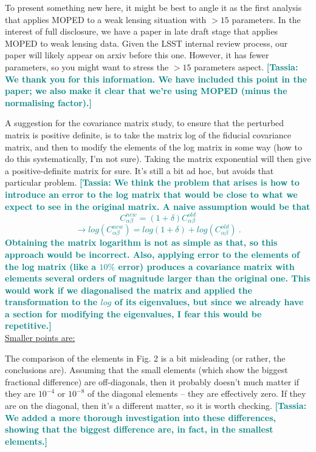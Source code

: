 \documentclass{article}
\newcommand\tassia[1]{{\bf {\textcolor{teal}{[Tassia: #1]}}}}
\begin{document}
	To present something new here, it might be best to angle it as the first analysis that applies MOPED to a weak lensing situation with $>15$ parameters.   In the interest of full disclosure, we have a paper in late draft stage that applies MOPED to weak lensing data.  Given the LSST internal review process, our paper will likely appear on arxiv before this one.  However, it has fewer parameters, so you might want to stress the $>15$ parameters aspect.
	\tassia{We thank you for this information. We have included this point in the paper; we also make it clear that we're using MOPED (minus the normalising factor).}
	
	A suggestion for the covariance matrix study, to ensure that the perturbed matrix is positive definite, is to take the matrix log of the fiducial covariance matrix, and then to modify the elements of the log matrix in some way (how to do this systematically, I’m not sure).  Taking the matrix exponential will then give a positive-definite matrix for sure. It’s still a bit ad hoc, but avoids that particular problem. 
	\tassia{We think the problem that arises is how to introduce an error to the log matrix that would be close to what we expect to see in the original matrix. A naive assumption would be that 
	$$C^{new}_{\alpha \beta} = (1 + \delta)C^{old}_{\alpha \beta}$$
	$$\rightarrow log \left( C^{new}_{\alpha \beta}\right) = log(1 + \delta) + log \left( C^{old}_{\alpha \beta} \right)\ .$$ Obtaining the matrix logarithm is not as simple as that, so this approach would be incorrect. Also, applying error to the elements of the log matrix (like a $10\%$ error) produces a covariance matrix with elements several orders of magnitude larger than the original one. This would work if we diagonalised the matrix and applied the transformation to the $log$ of its eigenvalues, but since we already have a section for modifying the eigenvalues, I fear this would be repetitive.}\\

	\underline{Smaller points are:}
	
	The comparison of the elements in Fig. 2 is a bit misleading (or rather, the conclusions are).  Assuming that the small elements (which show the biggest fractional difference) are off-diagonals, then it probably doesn’t much matter if they are $10^{-4}$ or $10^{-8}$ of the diagonal elements – they are effectively zero.  If they are on the diagonal, then it’s a different matter, so it is worth checking. \tassia{We added a more thorough investigation into these differences, showing that the biggest difference are, in fact, in the smallest elements.}
	
\end{document}
